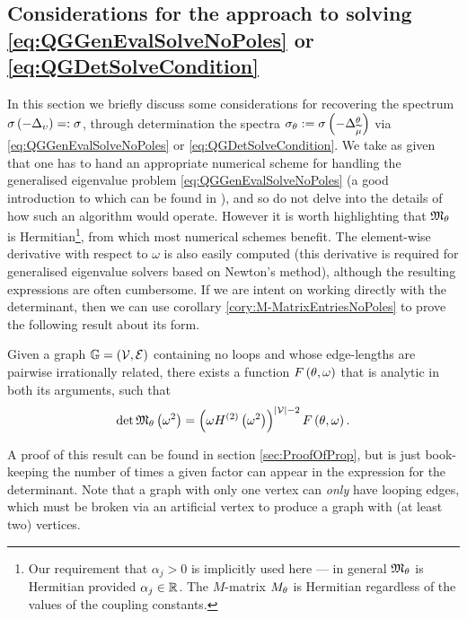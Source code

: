 \subsection{Considerations for the approach to solving \eqref{eq:QGGenEvalSolveNoPoles} or \eqref{eq:QGDetSolveCondition}} \label{ssec:ApproachConsiderations}
In this section we briefly discuss some considerations for recovering the spectrum $\sigma\left( -\Delta_{\upsilon} \right)=:\sigma$, through determination the spectra $\sigma_{\theta}:=\sigma\left( -\Delta_{\widetilde{\mu}}^{\theta} \right)$ via \eqref{eq:QGGenEvalSolveNoPoles} or \eqref{eq:QGDetSolveCondition}.
We take as given that one has to hand an appropriate numerical scheme for handling the generalised eigenvalue problem \eqref{eq:QGGenEvalSolveNoPoles} (a good introduction to which can be found in \cite{guttel2017nonlinear}), and so do not delve into the details of how such an algorithm would operate.
However it is worth highlighting that $\mathfrak{M}_\theta$ is Hermitian\footnote{Our requirement that $\alpha_j>0$ is implicitly used here --- in general $\mathfrak{M}_{\theta}$ is Hermitian provided $\alpha_j\in\mathbb{R}$. The $M$-matrix $M_{\theta}$ is Hermitian regardless of the values of the coupling constants.}, from which most numerical schemes benefit.
The element-wise derivative with respect to $\omega$ is also easily computed (this derivative is required for generalised eigenvalue solvers based on Newton's method), although the resulting expressions are often cumbersome.
If we are intent on working directly with the determinant, then we can use corollary \ref{cory:M-MatrixEntriesNoPoles} to prove the following result about its form.
\begin{prop} \label{prop:MMatrixDetForm}
	Given a graph $\mathbb{G} = \left( \mathcal{V}, \mathcal{E} \right)$ containing no loops and whose edge-lengths are pairwise irrationally related, there exists a function $F\left( \theta,\omega \right)$ that is analytic in both its arguments, such that
	\begin{align} \label{eq:MMatrixDetForm}
		\det\mathfrak{M}_\theta\left( \omega^2 \right) = \left(  \omega H^{(2)}\left( \omega^2 \right)  \right)^{\left\lvert \mathcal{V} \right\rvert-2} F\left( \theta,\omega \right).
	\end{align}
\end{prop}
A proof of this result can be found in section \ref{sec:ProofOfProp}, but is just book-keeping the number of times a given factor can appear in the expression for the determinant.
Note that a graph with only one vertex can \emph{only} have looping edges, which must be broken via an artificial vertex to produce a graph with (at least two) vertices.
